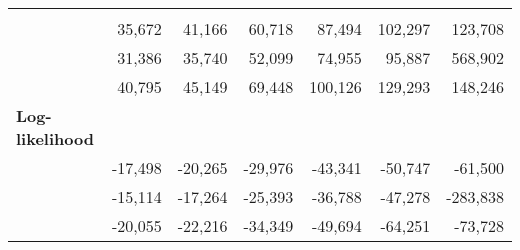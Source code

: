 \begin{tabular}{lllllll}
  \multicolumn{1}{|r}{} &
  \multicolumn{1}{r}{} &
  \multicolumn{1}{r}{} &
  \multicolumn{1}{r}{} &
  \multicolumn{1}{r}{} &
  \multicolumn{1}{r}{} \\
\multicolumn{1}{l}{\hspace{1em}{Model (A)}} &
  \multicolumn{1}{|r}{35,672} &
  \multicolumn{1}{r}{41,166} &
  \multicolumn{1}{r}{60,718} &
  \multicolumn{1}{r}{87,494} &
  \multicolumn{1}{r}{102,297} &
  \multicolumn{1}{r}{123,708} \\
\multicolumn{1}{l}{\hspace{1em}{Model (B)}} &
  \multicolumn{1}{|r}{31,386} &
  \multicolumn{1}{r}{35,740} &
  \multicolumn{1}{r}{52,099} &
  \multicolumn{1}{r}{74,955} &
  \multicolumn{1}{r}{95,887} &
  \multicolumn{1}{r}{568,902} \\
\multicolumn{1}{l}{\hspace{1em}{Model (C)}} &
  \multicolumn{1}{|r}{40,795} &
  \multicolumn{1}{r}{45,149} &
  \multicolumn{1}{r}{69,448} &
  \multicolumn{1}{r}{100,126} &
  \multicolumn{1}{r}{129,293} &
  \multicolumn{1}{r}{148,246} \\
\multicolumn{1}{l}{\textbf{Log-likelihood}} &
  \multicolumn{1}{|r}{} &
  \multicolumn{1}{r}{} &
  \multicolumn{1}{r}{} &
  \multicolumn{1}{r}{} &
  \multicolumn{1}{r}{} &
  \multicolumn{1}{r}{} \\
\multicolumn{1}{l}{\hspace{1em}{Model (A)}} &
  \multicolumn{1}{|r}{-17,498} &
  \multicolumn{1}{r}{-20,265} &
  \multicolumn{1}{r}{-29,976} &
  \multicolumn{1}{r}{-43,341} &
  \multicolumn{1}{r}{-50,747} &
  \multicolumn{1}{r}{-61,500} \\
\multicolumn{1}{l}{\hspace{1em}{Model (B)}} &
  \multicolumn{1}{|r}{-15,114} &
  \multicolumn{1}{r}{-17,264} &
  \multicolumn{1}{r}{-25,393} &
  \multicolumn{1}{r}{-36,788} &
  \multicolumn{1}{r}{-47,278} &
  \multicolumn{1}{r}{-283,838} \\
\multicolumn{1}{l}{\hspace{1em}{Model (C)}} &
  \multicolumn{1}{|r}{-20,055} &
  \multicolumn{1}{r}{-22,216} &
  \multicolumn{1}{r}{-34,349} &
  \multicolumn{1}{r}{-49,694} &
  \multicolumn{1}{r}{-64,251} &
  \multicolumn{1}{r}{-73,728} \\
\cline{1-7}
\end{tabular}
